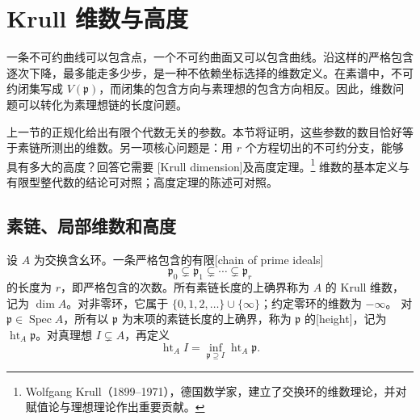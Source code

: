 
% 
% 

\section{Krull 维数与高度}
\label{g5:sec:0303}

一条不可约曲线可以包含点，一个不可约曲面又可以包含曲线。沿这样的严格包含逐次下降，最多能走多少步，是一种不依赖坐标选择的维数定义。在素谱中，不可约闭集写成 \(V(\mathfrak p)\)，而闭集的包含方向与素理想的包含方向相反。因此，维数问题可以转化为素理想链的长度问题。

\ProseParagraphBreak

上一节的正规化给出有限个代数无关的参数。本节将证明，这些参数的数目恰好等于素链所测出的维数。另一项核心问题是：用 \(r\) 个方程切出的不可约分支，能够具有多大的高度？回答它需要 [Krull dimension]及高度定理。\footnote{Wolfgang Krull（1899--1971），德国数学家，建立了交换环的维数理论，并对赋值论与理想理论作出重要贡献。} 维数的基本定义与有限型整代数的结论可对照\cite[第5节，第30--35页]{Matsumura1989}；高度定理的陈述可对照\cite[第13节，定理13.5]{Matsumura1989}。

\subsection{素链、局部维数和高度}
\label{g5:subsec:0303:01}

\begin{definition}\label{g5:def:krull-dimension}
	设 \(A\) 为交换含幺环。一条严格包含的有限[chain of prime ideals]
	\[
	\mathfrak p_0\subsetneq\mathfrak p_1\subsetneq\cdots\subsetneq\mathfrak p_r
	\]
	的长度为 \(r\)，即严格包含的次数。所有素链长度的上确界称为 \(A\) 的 Krull 维数，记为 \(\dim A\)。对非零环，它属于 \(\{0,1,2,\ldots\}\cup\{\infty\}\)；约定零环的维数为 \(-\infty\)。
	对 \(\mathfrak p\in\operatorname{Spec}A\)，所有以 \(\mathfrak p\) 为末项的素链长度的上确界，称为 \(\mathfrak p\) 的[height]，记为 \(\operatorname{ht}_A\mathfrak p\)。对真理想 \(I\subsetneq A\)，再定义
	\[
	\operatorname{ht}_A I
	=\inf_{\mathfrak p\supseteq I}\operatorname{ht}_A\mathfrak p.
	\]
\end{definition}

